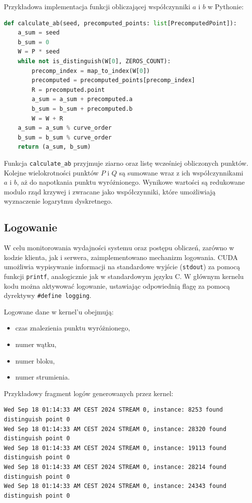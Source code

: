 Przykładowa implementacja funkcji obliczającej współczynniki $a$ i $b$ w Pythonie:

\begin{lstlisting}[language=Python, caption=Obliczanie współczynników $a$ i $b$]
def calculate_ab(seed, precomputed_points: list[PrecomputedPoint]):
    a_sum = seed
    b_sum = 0
    W = P * seed
    while not is_distinguish(W[0], ZEROS_COUNT):
        precomp_index = map_to_index(W[0])
        precomputed = precomputed_points[precomp_index]
        R = precomputed.point
        a_sum = a_sum + precomputed.a
        b_sum = b_sum + precomputed.b
        W = W + R
    a_sum = a_sum % curve_order
    b_sum = b_sum % curve_order
    return (a_sum, b_sum)
\end{lstlisting}

Funkcja \texttt{calculate\_ab} przyjmuje ziarno oraz listę wcześniej
obliczonych punktów. Kolejne wielokrotności punktów $P$ i $Q$ są sumowane wraz
z ich współczynnikami $a$ i $b$, aż do napotkania punktu wyróżnionego. Wynikowe
wartości są redukowane modulo rząd krzywej i zwracane jako współczynniki, które
umożliwiają wyznaczenie logarytmu dyskretnego.

\subsection{Logowanie}

W celu monitorowania wydajności systemu oraz postępu obliczeń, zarówno w kodzie
klienta, jak i serwera, zaimplementowano mechanizm logowania. CUDA umożliwia
wypisywanie informacji na standardowe wyjście (\texttt{stdout}) za pomocą funkcji
\texttt{printf}, analogicznie jak w standardowym języku C. W głównym kernelu kodu
można aktywować logowanie, ustawiając odpowiednią flagę za pomocą dyrektywy
\texttt{\#define logging}.

Logowane dane w kernel'u obejmują:
\begin{itemize}
    \item czas znalezienia punktu wyróżnionego,
    \item numer wątku,
    \item numer bloku,
    \item numer strumienia.
\end{itemize}

Przykładowy fragment logów generowanych przez kernel:
\begin{verbatim}
Wed Sep 18 01:14:33 AM CEST 2024 STREAM 0, instance: 8253 found distinguish point 0
Wed Sep 18 01:14:33 AM CEST 2024 STREAM 0, instance: 28320 found distinguish point 0
Wed Sep 18 01:14:33 AM CEST 2024 STREAM 0, instance: 19113 found distinguish point 0
Wed Sep 18 01:14:33 AM CEST 2024 STREAM 0, instance: 28214 found distinguish point 0
Wed Sep 18 01:14:33 AM CEST 2024 STREAM 0, instance: 24343 found distinguish point 0
\end{verbatim}


